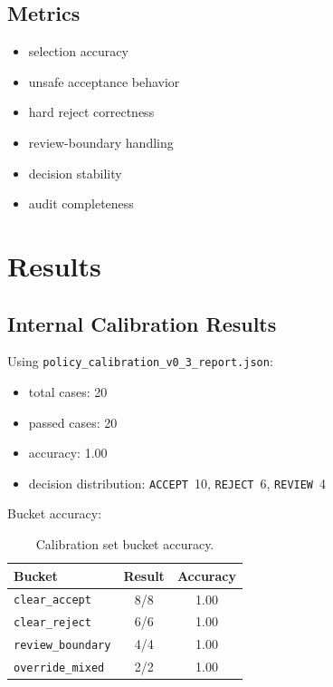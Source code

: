 \documentclass[11pt,a4paper]{article}
\begin{document}
\subsection{Metrics}
\begin{itemize}[leftmargin=*, itemsep=2pt]
  \item selection accuracy
  \item unsafe acceptance behavior
  \item hard reject correctness
  \item review-boundary handling
  \item decision stability
  \item audit completeness
\end{itemize}

\section{Results}

\subsection{Internal Calibration Results}
Using \texttt{policy\_calibration\_v0\_3\_report.json}:
\begin{itemize}[leftmargin=*, itemsep=2pt]
  \item total cases: 20
  \item passed cases: 20
  \item accuracy: 1.00
  \item decision distribution: \texttt{ACCEPT}~10, \texttt{REJECT}~6, \texttt{REVIEW}~4
\end{itemize}

\vspace{6pt}
\noindent Bucket accuracy:

\begin{table}[h]
\centering
\begin{tabular}{lcc}
\toprule
\textbf{Bucket} & \textbf{Result} & \textbf{Accuracy} \\
\midrule
\texttt{clear\_accept} & 8/8 & 1.00 \\
\texttt{clear\_reject} & 6/6 & 1.00 \\
\texttt{review\_boundary} & 4/4 & 1.00 \\
\texttt{override\_mixed} & 2/2 & 1.00 \\
\bottomrule
\end{tabular}
\caption{Calibration set bucket accuracy.}
\end{table}
\end{document}
